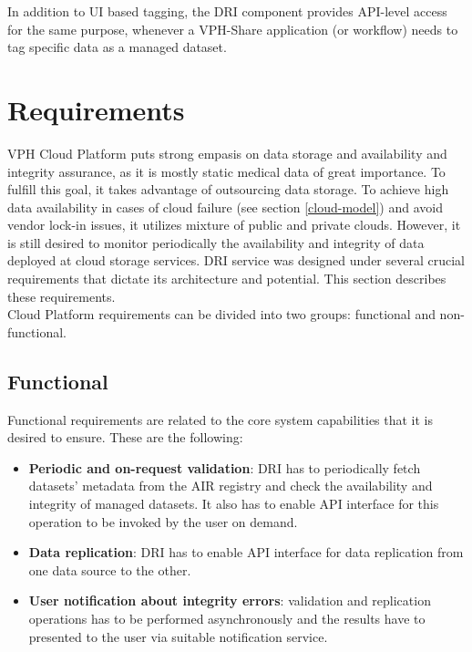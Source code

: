 In addition to UI based tagging, the DRI component provides API-level access
for the same purpose, whenever a VPH-Share application (or workflow) needs to
tag specific data as a managed dataset.
	\section{Requirements}
	\label{requirements}
VPH Cloud Platform puts strong empasis on data storage and availability and
integrity assurance, as it is mostly static medical data of great importance.
To fulfill this goal, it takes advantage of outsourcing data storage. To
achieve high data availability in cases of cloud failure (see section
\ref{cloud-model}) and avoid vendor lock-in issues, it utilizes mixture of
public and private clouds. However, it is still desired to monitor periodically
the availability and integrity of data deployed at cloud storage services. DRI
service was designed under several crucial requirements that dictate its
architecture and potential. This section describes these requirements.\\
	
Cloud Platform requirements can be divided into two groups: functional and
non-functional.
		\subsection{Functional}
Functional requirements are related to the core system capabilities that it
is desired to ensure. These are the following:

\begin{itemize}
	\item \textbf{Periodic and on-request validation}: DRI has to periodically
	fetch datasets' metadata from the AIR registry and check the availability
	and integrity of managed datasets. It also has to enable API interface for
	this operation to be invoked by the user on demand.
	\item \textbf{Data replication}: DRI has to enable API interface for data
	replication from one data source to the other. 
	\item \textbf{User notification about integrity errors}: validation and
	replication operations has to be performed asynchronously and the results
	have to presented to the user via suitable notification service.
\end{itemize}
